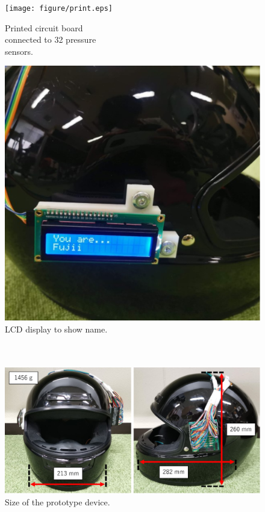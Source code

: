 \documentclass[english,preprint,JIP]{ipsj}
\begin{document}
\begin{figure}[!t]
\begin{minipage}{0.48\hsize}
  \begin{center}
    \texttt{[image: figure/print.eps]}
  \end{center}
  \caption{Printed circuit board\\connected to 32 pressure\\sensors.}
  \label{fig:print}
  \end{minipage}
\begin{minipage}{0.48\hsize}
  \begin{center}
    \includegraphics[width=1\linewidth]{figure/lcd.eps}
  \end{center}
  \caption{LCD display to show name.\\~\\~}
  \label{fig:lcd}
  \end{minipage}
\end{figure}

\begin{figure}[!t]
  \begin{center}
    \includegraphics[width=0.9\linewidth]{figure/size.eps}
  \end{center}
  \caption{Size of the prototype device.}
  \label{fig:size}
\end{figure}
\end{document}
